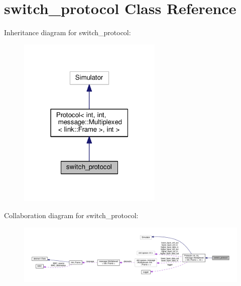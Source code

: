 \hypertarget{classswitch__protocol}{}\section{switch\+\_\+protocol Class Reference}
\label{classswitch__protocol}


Inheritance diagram for switch\+\_\+protocol\+:\nopagebreak
\begin{figure}[H]
\begin{center}
\leavevmode
\includegraphics[width=195pt]{classswitch__protocol__inherit__graph}
\end{center}
\end{figure}


Collaboration diagram for switch\+\_\+protocol\+:\nopagebreak
\begin{figure}[H]
\begin{center}
\leavevmode
\includegraphics[width=350pt]{classswitch__protocol__coll__graph}
\end{center}
\end{figure}

